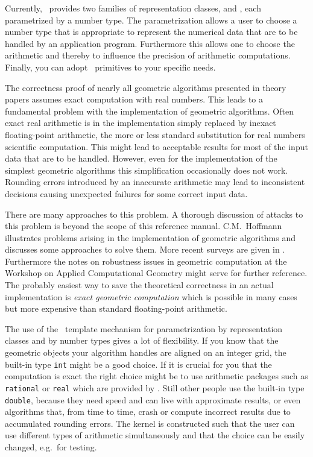Currently, \cgal\ provides two families of representation classes,
 and ,
each parametrized by a number type. 
The parametrization allows a user to choose a
number type that is appropriate to represent the numerical data that
are to be handled by an application program. 
Furthermore this allows one to choose the arithmetic and thereby
to influence the precision of arithmetic computations.
Finally, you can adopt \cgal\ primitives to your specific needs. 

The correctness proof of nearly all geometric algorithms presented
in theory papers assumes exact computation with real numbers.
This leads to a fundamental problem with the implementation of
geometric algorithms.
Often exact real arithmetic is in the implementation simply
replaced by inexact floating-point arithmetic, the more
or less standard substitution for real numbers scientific computation.
This might lead to acceptable results for most of the input data
that are to be handled.
However, even for the implementation of the simplest geometric
algorithms this simplification occasionally does not work.
Rounding errors introduced by an inaccurate arithmetic may lead to
inconsistent decisions causing unexpected failures for some correct
input data.

There are many approaches to this problem. A thorough discussion of 
attacks to this problem is beyond the scope of this reference manual.
C.M.~Hoffmann~\cite{Ho_GSM,Ho_prec89} illustrates
problems arising in the implementation of geometric algorithms
and discusses some approaches to solve them.
More recent surveys are given in \cite{fortune_survey,yap:crc,Udine_notes}.
Furthermore the notes on robustness issues in geometric computation
at the Workshop on Applied Computational Geometry \cite{wacg} might
serve for further reference.
The probably easiest way to save the theoretical correctness in an
actual implementation is {\em exact geometric computation} 
\cite{BKMNSU95_prec,Yap_exact_CCCG,YD_ecp_prec}
which is possible in many cases but more expensive
than standard floating-point arithmetic.

The use of the \CC\ template mechanism for parametrization by
representation classes and by number types gives a lot of
flexibility. If you know that the geometric objects
your algorithm handles are aligned on an integer grid, the built-in
type {\tt int} might be a good choice. If it is crucial for you
that the computation is exact the right choice might be to use 
arithmetic packages such as {\tt rational} or {\tt real}
\cite{reals_TR}
which are provided by \leda. Still other people use the built-in
type {\tt double}, because they need speed and can live with
approximate results, or even algorithms that, from time to time,
crash or compute incorrect results due to accumulated rounding errors.
The kernel is constructed such that the user can use 
different types of arithmetic simultaneously and that the 
choice can be easily changed, e.g.\ for testing.  

